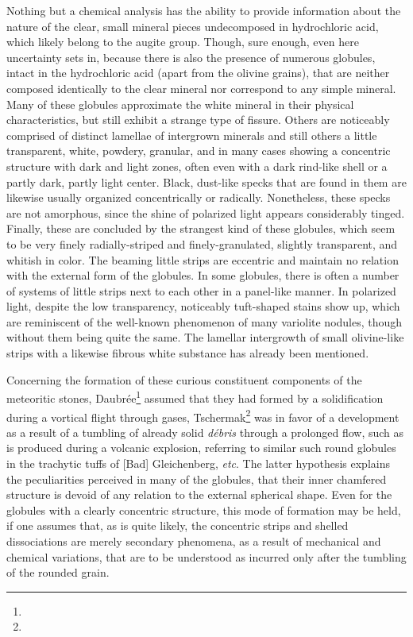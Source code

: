 \documentclass[a4paper, 12pt, oneside]{article}
\begin{document}
Nothing but a chemical analysis has the ability to provide information about the nature of the clear, small mineral pieces undecomposed in hydrochloric acid, which likely belong to the augite group. Though, sure enough, even here uncertainty sets in, because there is also the presence of numerous globules, intact in the hydrochloric acid (apart from the olivine grains), that are neither composed identically to the clear mineral nor correspond to any simple mineral. Many of these globules approximate the white mineral in their physical characteristics, but still exhibit a strange type of fissure. Others are noticeably comprised of distinct lamellae of intergrown minerals and still others a little transparent, white, powdery, granular, and in many cases showing a concentric structure with dark and light zones, often even with a dark rind-like shell or a partly dark, partly light center. Black, dust-like specks that are found in them are likewise usually organized concentrically or radically. Nonetheless, these specks are not amorphous, since the shine of polarized light appears considerably tinged. Finally, these are concluded by the strangest kind of these globules, which seem to be very finely radially-striped and finely-granulated, slightly transparent, and whitish in color. The beaming little strips are eccentric and maintain no relation with the external form of the globules. In some globules, there is often a number of systems of little strips next to each other in a panel-like manner. In polarized light, despite the low transparency, noticeably tuft-shaped stains show up, which are reminiscent of the well-known phenomenon of many variolite nodules, though without them being quite the same. The lamellar intergrowth of small olivine-like strips with a likewise fibrous white substance has already been mentioned.

Concerning the formation of these curious constituent components of the meteoritic stones, Daubrée\footnote{} assumed that they had formed by a solidification during a vortical flight through gases, Tschermak\footnote{} was in favor of a development as a result of a tumbling of already solid \emph{débris} through a prolonged flow, such as is produced during a volcanic explosion, referring to similar such round globules in the trachytic tuffs of [Bad] Gleichenberg, \emph{etc}. The latter hypothesis explains the peculiarities perceived in many of the globules, that their inner chamfered structure is devoid of any relation to the external spherical shape. Even for the globules with a clearly concentric structure, this mode of formation may be held, if one assumes that, as is quite likely, the concentric strips and shelled dissociations are merely secondary phenomena, as a result of mechanical and chemical variations, that are to be understood as incurred only after the tumbling of the rounded grain.
\end{document}
